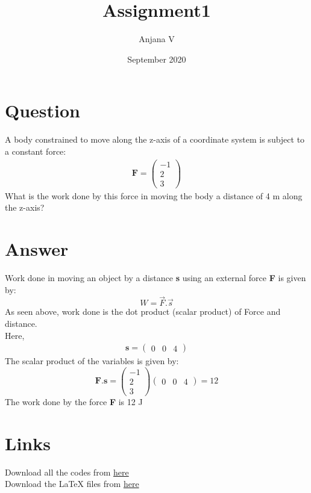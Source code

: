 \documentclass{article}
\title{Assignment1}
\author{Anjana V }
\date{September 2020}
\begin{document}
\maketitle
\section*{Question}
A body constrained to move along the z-axis of a coordinate system is subject to a constant force:
\begin{align*}
\textbf{F}=\begin{pmatrix}
-1\\
2\\
3
\end{pmatrix}    
\end{align*}
What is the work done by this force in moving the body a distance of 4 m along the z-axis?
\section*{Answer}
Work done in moving an object by a distance \textbf{s} using an external force \textbf{F} is given by:
$$W=\vec{F} . \vec{s}$$
As seen above, work done is the dot product (scalar product) of Force and distance.
\\Here, 
\begin{align*}
\textbf{s}=\begin{pmatrix}
0 & 0 & 4
\end{pmatrix}    
\end{align*}
The scalar product of the variables is given by:
$$\textbf{F}.\textbf{s} = \begin{pmatrix}
-1\\
2\\
3
\end{pmatrix}\begin{pmatrix}
0 & 0 & 4
\end{pmatrix}=12$$
The work done by the force \textbf{F} is 12 J
\section*{Links}
Download all the codes from \href{https://github.com/anjanavasudevan/grad_schoolwork/blob/master/EE5609/Assignment1/assignment.py}{here} 
\\Download the LaTeX files from \href{https://github.com/anjanavasudevan/grad_schoolwork/tree/master/EE5609/Assignment1/latex}{here}
\end{document}
